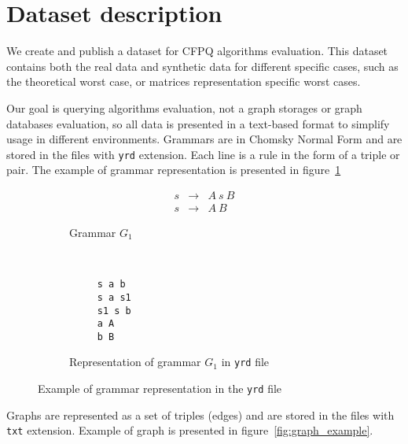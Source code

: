 \section{Dataset description}

We create and publish a dataset for CFPQ algorithms evaluation.
This dataset contains both the real data and synthetic data for different specific cases, such as the theoretical worst case, or matrices representation specific worst cases.

Our goal is querying algorithms evaluation, not a graph storages or graph databases evaluation, so all data is presented in a text-based format to simplify usage in different environments.
Grammars are in Chomsky Normal Form and are stored in the files with \verb|yrd| extension.
Each line is a rule in the form of a triple or pair.
The example of grammar representation is presented in figure~\ref{fig:grammar_example}


\begin{figure}[h]
    \centering
    \begin{subfigure}[b]{0.24\textwidth}
        \centering
        \[
         \begin{array}{rcl}
           s & \rightarrow & A \ s \ B \\
           s & \rightarrow & A \ B
         \end{array}
         \]
        \caption{Grammar $G_1$}
    \end{subfigure}%
    ~
    \begin{subfigure}[b]{0.24\textwidth}
        \centering
        \begin{verbatim}
     s a b
     s a s1
     s1 s b
     a A
     b B
        \end{verbatim}
        \caption{Representation of grammar $G_1$ in \texttt{yrd} file}
    \end{subfigure}
    \caption{Example of grammar representation in the \texttt{yrd} file}
    \label{fig:grammar_example}
\end{figure}

Graphs are represented as a set of triples (edges) and are stored in the files with \verb|txt| extension.
Example of graph is presented in figure~\ref{fig:graph_example}.


